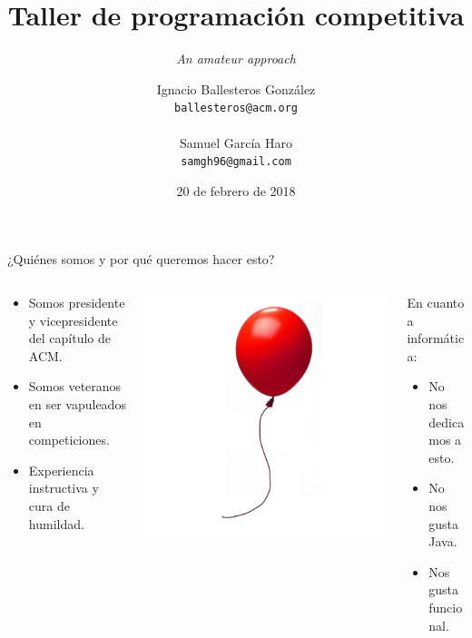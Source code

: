 \documentclass[10pt]{beamer}
\title{Taller de programación competitiva}
\subtitle{\textit{An amateur approach}}
\date{20 de febrero de 2018}
\author{
  Ignacio Ballesteros González\\
  {\color{mygray}\texttt{ballesteros@acm.org}\\}
  \\
  Samuel García Haro\\
  {\color{mygray}\texttt{samgh96@gmail.com}\\}
}
\institute{}
\begin{document}
\maketitle

\begin{frame}{¿Quiénes somos y por qué queremos hacer esto?}
  \begin{columns}[onlytextwidth]
    \begin{column}{0.3\textwidth}
      \centering
      \begin{itemize}
      \item Somos presidente y vicepresidente del capítulo de ACM.
      \item Somos veteranos en ser vapuleados en competiciones.
      \item Experiencia instructiva y cura de humildad.
      \end{itemize}
    \end{column}
    \begin{column}{0.3\textwidth}
      \centering
      \includegraphics[width=\textwidth]{globo.png}
    \end{column}
    \begin{column}{0.35\textwidth}
      En cuanto a informática:
      \begin{itemize}
      \item No nos dedicamos a esto.
      \item No nos gusta Java.
      \item Nos gusta funcional.
      \end{itemize}
    \end{column}
  \end{columns}
\end{frame}
\end{document}
